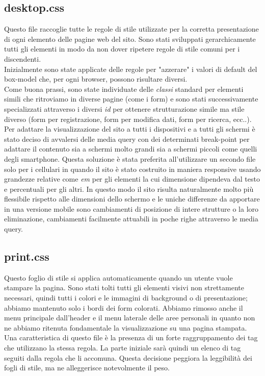 	\subsection{desktop.css}
	Questo file raccoglie tutte le regole di stile utilizzate per la corretta presentazione di ogni elemento delle pagine web del sito. Sono stati sviluppati gerarchicamente tutti gli elementi in modo da non dover ripetere regole di stile comuni per i discendenti. \\
	Inizialmente sono state applicate delle regole per "azzerare" i valori di default del box-model che, per ogni browser, possono risultare diversi.\\
	Come buona prassi, sono state individuate delle \emph{classi} standard per elementi simili che ritroviamo in diverse pagine (come i form) e sono stati successivamente specializzati attraverso i diversi \emph{id} per ottenere strutturazione simile ma stile diverso (form per registrazione, form per modifica dati, form per ricerca, ecc..).\\
	Per adattare la visualizzazione del sito a tutti i dispositivi e a tutti gli schermi è stato deciso di avvalersi delle media query con dei determinati break-point per adattare il contenuto sia a schermi molto grandi sia a schermi piccoli come quelli degli smartphone. Questa soluzione è stata preferita all'utilizzare un secondo file solo per i cellulari in quando il sito è stato costruito in maniera responsive usando grandezze relative come \emph{em} per gli elementi la cui dimensione dipendeva dal testo e percentuali per gli altri. In questo modo il sito risulta naturalmente molto più flessibile rispetto alle dimensioni dello schermo e le uniche differenze da apportare in una versione mobile sono cambiamenti di posizione di intere strutture o la loro eliminazione, cambiamenti facilmente attuabili in poche righe attraverso le media query.

	
	\subsection{print.css}
	Questo foglio di stile si applica automaticamente quando un utente vuole
stampare la pagina. Sono stati tolti tutti gli elementi visivi non strettamente necessari, quindi tutti i colori e le immagini di background o di presentazione; abbiamo mantenuto solo i bordi dei form colorati. Abbiamo rimosso anche il menu principale dall'header e il menu laterale delle aree personali in quanto non ne abbiamo ritenuta fondamentale la visualizzazione su una pagina stampata. Una caratteristica di questo file è la presenza di un forte raggruppamento dei tag che utilizzano la stessa regola. La parte iniziale sarà quindi un elenco di tag seguiti dalla regola che li accomuna. Questa decisione peggiora la leggibilità dei fogli di stile, ma ne alleggerisce notevolmente il peso.




